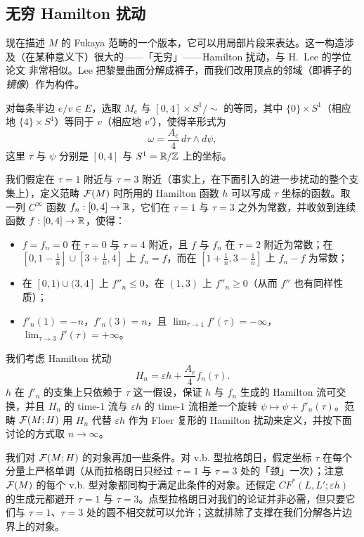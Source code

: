 \subsection{无穷 Hamilton 扰动}\label{ss:FMH}

现在描述 $M$ 的 Fukaya 范畴的一个版本，它可以用局部片段来表达。这一构造涉及（在某种意义下）很大的——「无穷」——Hamilton 扰动，与 H.~Lee 的学位论文 \cite{Lee} 非常相似。Lee 把黎曼曲面分解成裤子，而我们改用顶点的邻域（即裤子的\emph{镜像}）作为构件。

对每条半边 $e/v\in E$，选取 $M_e$ 与 $[0,4]\times S^1/\!\sim$ 的等同，其中 $\{0\}\times S^1$（相应地 $\{4\}\times S^1$）等同于 $v$（相应地 $v'$），使得辛形式为
\[
\omega=\frac{A_e}{4}\,d\tau\wedge d\psi,
\]
这里 $\tau$ 与 $\psi$ 分别是 $[0,4]$ 与 $S^1=\mathbb{R}/\mathbb{Z}$ 上的坐标。

我们假定在 $\tau=1$ 附近与 $\tau=3$ 附近（事实上，在下面引入的进一步扰动的整个支集上），定义范畴 $\mathcal{F}(M)$ 时所用的 Hamilton 函数 $h$ 可以写成 $\tau$ 坐标的函数。取一列 $C^\infty$ 函数 $f_n:[0,4]\to\mathbb{R}$，它们在 $\tau=1$ 与 $\tau=3$ 之外为常数，并收敛到连续函数 $f:[0,4]\to\mathbb{R}$，使得：
\begin{itemize}
\item[(i)] $f=f_n=0$ 在 $\tau=0$ 与 $\tau=4$ 附近，且 $f$ 与 $f_n$ 在 $\tau=2$ 附近为常数；在 $[0,1-\frac1n]\cup[3+\frac1n,4]$ 上 $f_n=f$，而在 $[1+\frac1n,3-\frac1n]$ 上 $f_n-f$ 为常数；
\item[(ii)] 在 $[0,1)\cup(3,4]$ 上 $f''_n\leq 0$，在 $(1,3)$ 上 $f''_n\geq 0$（从而 $f''$ 也有同样性质）；
\item[(iii)] $f'_n(1)=-n$，$f'_n(3)=n$，且 $\lim_{\tau\to 1}f'(\tau)=-\infty$，$\lim_{\tau\to 3}f'(\tau)=+\infty$。
\end{itemize}

我们考虑 Hamilton 扰动
\[
H_n=\varepsilon h+\frac{A_e}{4}f_n(\tau).
\]
$h$ 在 $f'_n$ 的支集上只依赖于 $\tau$ 这一假设，保证 $h$ 与 $f_n$ 生成的 Hamilton 流可交换，并且 $H_n$ 的 time-$1$ 流与 $\varepsilon h$ 的 time-$1$ 流相差一个旋转 $\psi\mapsto\psi+f'_n(\tau)$。范畴 $\mathcal{F}(M;H)$ 用 $H_n$ 代替 $\varepsilon h$ 作为 Floer 复形的 Hamilton 扰动来定义，并按下面讨论的方式取 $n\to\infty$。

我们对 $\mathcal{F}(M;H)$ 的对象再加一些条件。对 v.b. 型拉格朗日，假定坐标 $\tau$ 在每个分量上严格单调（从而拉格朗日只经过 $\tau=1$ 与 $\tau=3$ 处的「颈」一次）；注意 $\mathcal{F}(M)$ 的每个 v.b. 型对象都同构于满足此条件的对象。还假定 $CF^*(L,L';\varepsilon h)$ 的生成元都避开 $\tau=1$ 与 $\tau=3$。点型拉格朗日对我们的论证并非必需，但只要它们与 $\tau=1$、$\tau=3$ 处的圆不相交就可以允许；这就排除了支撑在我们分解各片边界上的对象。

